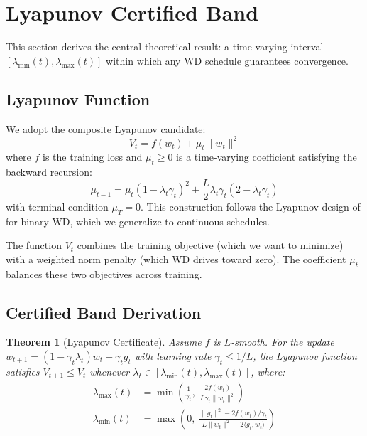 \documentclass{article}
\newtheorem{theorem}{Theorem}
\begin{document}
\section{Lyapunov Certified Band}
\label{sec:band}

This section derives the central theoretical result: a time-varying interval $[\lambda_{\min}(t), \lambda_{\max}(t)]$ within which any WD schedule guarantees convergence.

\subsection{Lyapunov Function}

We adopt the composite Lyapunov candidate:
\begin{equation}
V_t = f(w_t) + \mu_t \|w_t\|^2
\label{eq:lyapunov}
\end{equation}
where $f$ is the training loss and $\mu_t \geq 0$ is a time-varying coefficient satisfying the backward recursion:
\begin{equation}
\mu_{t-1} = \mu_t (1 - \lambda_t \gamma_t)^2 + \frac{L}{2} \lambda_t \gamma_t (2 - \lambda_t \gamma_t)
\label{eq:mu_recursion}
\end{equation}
with terminal condition $\mu_T = 0$. This construction follows the Lyapunov design of \citet{li2026lyapunov_binary} for binary WD, which we generalize to continuous schedules.

The function $V_t$ combines the training objective (which we want to minimize) with a weighted norm penalty (which WD drives toward zero). The coefficient $\mu_t$ balances these two objectives across training.

\subsection{Certified Band Derivation}

\begin{theorem}[Lyapunov Certificate]
\label{thm:lyapunov}
Assume $f$ is $L$-smooth. For the update $w_{t+1} = (1 - \gamma_t \lambda_t) w_t - \gamma_t g_t$ with learning rate $\gamma_t \leq 1/L$, the Lyapunov function satisfies $V_{t+1} \leq V_t$ whenever $\lambda_t \in [\lambda_{\min}(t), \lambda_{\max}(t)]$, where:
\begin{align}
\lambda_{\max}(t) &= \min\left(\frac{1}{\gamma_t}, \; \frac{2f(w_t)}{L \gamma_t \|w_t\|^2}\right) \label{eq:lambda_max}\\
\lambda_{\min}(t) &= \max\left(0, \; \frac{\|g_t\|^2 - 2f(w_t)/\gamma_t}{L \|w_t\|^2 + 2\langle g_t, w_t \rangle}\right) \label{eq:lambda_min}
\end{align}
\end{theorem}
\end{document}
